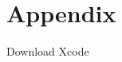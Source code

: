 \documentclass[11pt]{article}
\begin{document}
            \paragraph{}

        
        

        
\newpage
\let\Section\section 
\def\section*#1{\Section{#1}}  

    
    
\newpage
\Section{Appendix}
Download Xcode
        
\end{document}
